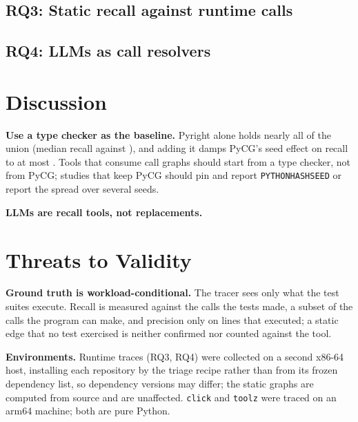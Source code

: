 \documentclass[conference]{IEEEtran}
\providecommand{\rqThreeBody}{\pending}
\providecommand{\rqFourBody}{\pending}
\providecommand{\rqDiscussionLlm}{\pending}
\begin{document}
\subsection{RQ3: Static recall against runtime calls}\label{sec:rq3}

\rqThreeBody{}

\subsection{RQ4: LLMs as call resolvers}\label{sec:rq4}

\rqFourBody{}

\section{Discussion}

\textbf{Use a type checker as the baseline.} Pyright alone holds nearly all of the union (median
recall \edgePyrightMed{} against \edgeUnionMed)\ifdefined\sweepUnionMaxDelta, and adding it damps
PyCG's seed effect on recall to at most \sweepUnionMaxDelta\fi. Tools that consume call graphs
should start from a type checker, not from PyCG; studies that keep PyCG should pin and report
\texttt{PYTHONHASHSEED} or report the spread over several seeds.

\textbf{LLMs are recall tools, not replacements.} \rqDiscussionLlm{}

\section{Threats to Validity}\label{sec:threats}

\textbf{Ground truth is workload-conditional.} The tracer sees only what the test suites execute.
Recall is measured against the calls the tests made, a subset of the calls the program can make,
and precision only on lines that executed; a static edge that no test exercised is neither
confirmed nor counted against the tool.

\textbf{Environments.} Runtime traces (RQ3, RQ4) were collected on a second x86-64 host, installing
each repository by the triage recipe rather than from its frozen dependency list, so dependency
versions may differ; the static graphs are computed from source and are unaffected. \texttt{click}
and \texttt{toolz} were traced on an arm64 machine; both are pure Python.
\end{document}
